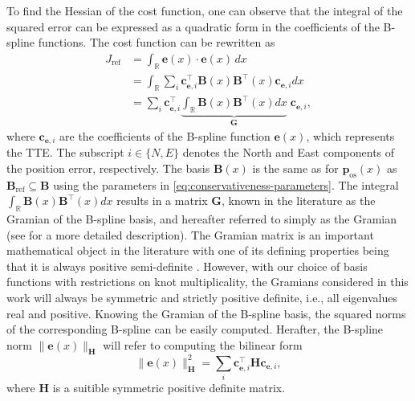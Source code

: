 To find the Hessian of the cost function, one can observe that the integral of the squared error can be expressed as a quadratic form in the coefficients of the B-spline functions. The cost function can be rewritten as
\begin{equation}
    \begin{aligned}
        J_\text{ref} &= \int_\mathbb R \mathbf e(x) \cdot \mathbf e(x) \, dx \\
        &= \int_\mathbb R \sum_i \mathbf c_{\mathbf e,i}^\top \mathbf B(x) \mathbf B^\top(x) \mathbf c_{\mathbf e,i}  dx \\
        &= \sum_i \mathbf c_{\mathbf e,i}^\top \underbrace{\int_\mathbb R \mathbf B(x) \mathbf B^\top(x) dx}_{\mathbf G} \;\mathbf c_{\mathbf e,i},
    \end{aligned}
\end{equation}
where $\mathbf c_{\mathbf e,i}$ are the coefficients of the B-spline function $\mathbf e(x)$, which represents the TTE. The subscript $i\in\{N,E\}$ denotes the North and East components of the position error, respectively.
The basis $\mathbf B(x)$ is the same as for $\mathbf p_\text{os}(x)$ as $\mathbf B_\text{ref} \subseteq \mathbf B$ using the parameters in \cref{eq:conservativeness-parameters}. 
The integral $\int_\mathbb R \mathbf B(x) \mathbf B^\top(x) dx$ results in a matrix $\mathbf G$, known in the literature as the Gramian of the B-spline basis, and hereafter referred to simply as the Gramian (see \citet{Chu2022} for a more detailed description).
The Gramian matrix is an important mathematical object in the literature with one of its defining properties being that it is always positive semi-definite \citep{horn2013positive}. However, with our choice of basis functions with restrictions on knot multiplicality, the Gramians considered in this work will always be symmetric and strictly positive definite, i.e., all eigenvalues real and positive. Knowing the Gramian of the B-spline basis, the squared norms of the corresponding B-spline can be easily computed. Herafter, the B-spline norm $\|\mathbf e(x)\|_\mathbf H$ will refer to computing the bilinear form
\begin{equation}\label{eq:b-spline-norm}
    \|\mathbf e(x)\|_\mathbf H^2 = \sum_i \mathbf c_{\mathbf e,i}^\top \mathbf H \mathbf c_{\mathbf e,i},
\end{equation}
where $\mathbf H$ is a suitible symmetric positive definite matrix. 

